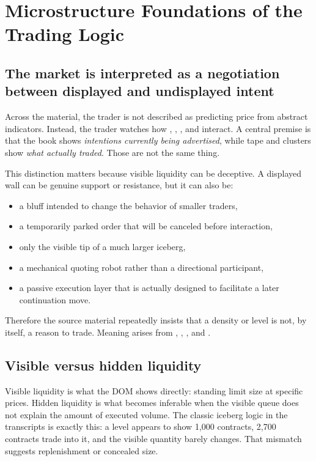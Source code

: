 \section{Microstructure Foundations of the Trading Logic}

\subsection{The market is interpreted as a negotiation between displayed and undisplayed intent}

Across the material, the trader is not described as predicting price from abstract indicators. Instead, the trader watches how , , , and  interact. A central premise is that the book shows \emph{intentions currently being advertised}, while tape and clusters show \emph{what actually traded}. Those are not the same thing.

This distinction matters because visible liquidity can be deceptive. A displayed wall can be genuine support or resistance, but it can also be:

\begin{itemize}[leftmargin=1.5em]
\item a bluff intended to change the behavior of smaller traders,
\item a temporarily parked order that will be canceled before interaction,
\item only the visible tip of a much larger iceberg,
\item a mechanical quoting robot rather than a directional participant,
\item a passive execution layer that is actually designed to facilitate a later continuation move.
\end{itemize}

Therefore the source material repeatedly insists that a density or level is not, by itself, a reason to trade. Meaning arises from , , , and .

\subsection{Visible versus hidden liquidity}

Visible liquidity is what the DOM shows directly: standing limit size at specific prices. Hidden liquidity is what becomes inferable when the visible queue does not explain the amount of executed volume. The classic iceberg logic in the transcripts is exactly this: a level appears to show 1{,}000 contracts, 2{,}700 contracts trade into it, and the visible quantity barely changes. That mismatch suggests replenishment or concealed size.

